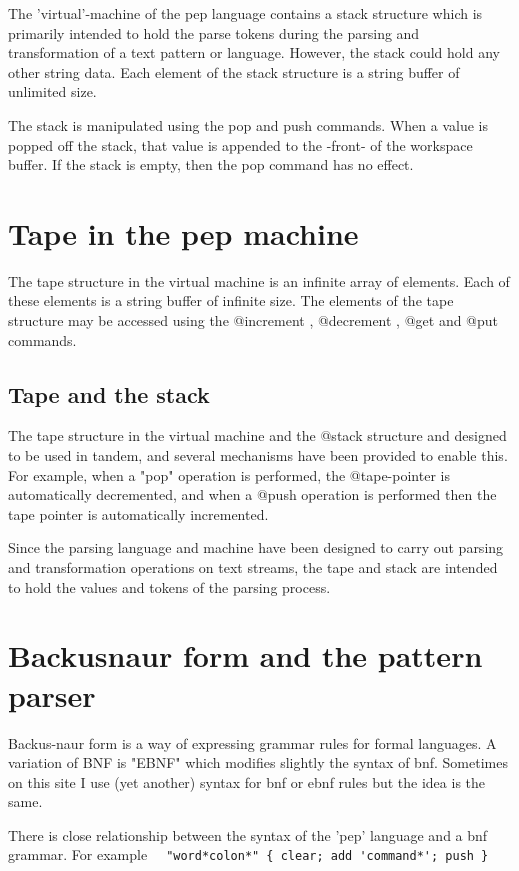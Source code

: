 \documentclass[a4paper,12pt]{article}
\begin{document}
  The 'virtual'-machine of the pep language contains
  a stack structure which is primarily intended to hold
  the parse tokens during the parsing and transformation
  of a text pattern or language. However, the stack
  could hold any other string data. Each element of the
  stack structure is a string buffer of unlimited size.

  The stack is manipulated using the pop and push commands.
  When a value is popped off the stack, that value is appended
  to the -front- of the workspace buffer. If the stack is
  empty, then the pop command has no effect.

\section{Tape in the pep machine}

 The tape structure in the virtual machine is an infinite
 array of elements. Each of these elements is a string buffer
 of infinite size. The elements of the tape structure may be
 accessed using the @increment , @decrement , @get and @put
 commands.

\subsection{Tape and the stack}

 The tape structure in the virtual machine and the @stack
 structure and designed to be used in tandem, and several
 mechanisms have been provided to enable this. For example,
 when a "pop" operation is performed, the @tape-pointer is
 automatically decremented, and when a @push operation is
 performed then the tape pointer is automatically incremented.

 Since the parsing language and machine have been designed
 to carry out parsing and transformation operations on
 text streams, the tape and stack are intended to hold
 the values and tokens of the parsing process.
 
\section{Backusnaur form and the pattern parser}

  Backus-naur form is a way of expressing grammar rules for formal languages.
  A variation of BNF is "EBNF" which modifies slightly the syntax of bnf.
  Sometimes on this site I use (yet another) syntax for bnf or ebnf rules but
  the idea is the same.

  There is close relationship between the syntax of the 'pep' language
  and a bnf grammar. For example 
 \verb|  "word*colon*" { clear; add 'command*'; push } |
\end{document}
